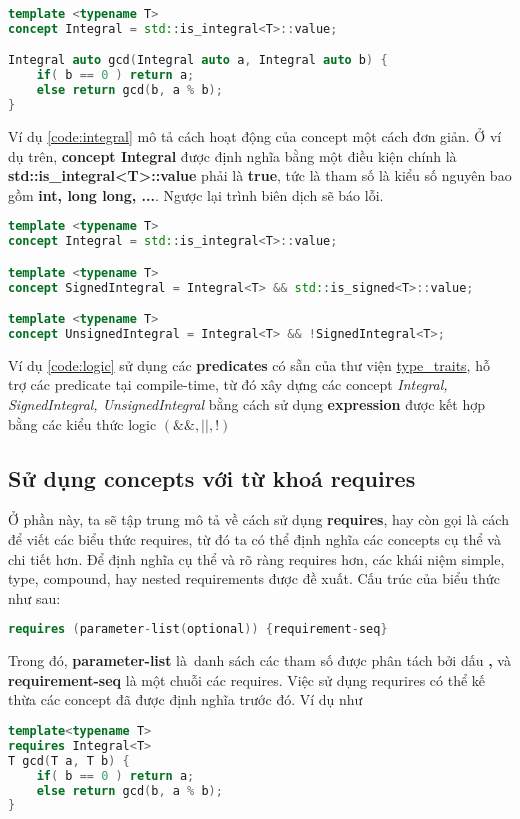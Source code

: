 \begin{lstlisting}[caption={Integral concept\cite{concept-def}},label={code:integral},language=C++]
template <typename T>
concept Integral = std::is_integral<T>::value;

Integral auto gcd(Integral auto a, Integral auto b) {
    if( b == 0 ) return a;
    else return gcd(b, a % b);
}    
\end{lstlisting}
Ví dụ \ref{code:integral} mô tả cách hoạt động của concept một cách đơn giản. Ở ví dụ trên, \textbf{concept Integral} được định nghĩa bằng một điều kiện chính là \textbf{std::is\_integral<T>::value} phải là \textbf{true}, tức là tham số là kiểu số nguyên bao gồm \textbf{int, long long, ...}. Ngược lại trình biên dịch sẽ báo lỗi.

\begin{lstlisting}[caption={Combine logic concept\cite{concept-def}},label={code:logic},language=C++]
template <typename T>         
concept Integral = std::is_integral<T>::value;

template <typename T>          
concept SignedIntegral = Integral<T> && std::is_signed<T>::value;

template <typename T>           
concept UnsignedIntegral = Integral<T> && !SignedIntegral<T>;
\end{lstlisting}
Ví dụ \ref{code:logic} sử dụng các \textbf{predicates} có sẵn của thư viện \href{https://en.cppreference.com/w/cpp/header/type_traits}{type\_traits}, hỗ trợ các predicate tại compile-time, từ đó xây dựng các concept \textit{Integral, SignedIntegral, UnsignedIntegral} bằng cách sử dụng \textbf{expression} được kết hợp bằng các kiểu thức logic $(\&\&,||,!)$

\subsection{Sử dụng concepts với từ khoá requires}
\label{sec:require_expr}
Ở phần này, ta sẽ tập trung mô tả về cách sử dụng \textbf{requires}, hay còn gọi là cách để viết các biểu thức requires, từ đó ta có thể định nghĩa các concepts cụ thể và chi tiết hơn. Để định nghĩa cụ thể và rõ ràng requires hơn, các khái niệm simple, type, compound, hay nested requirements được đề xuất. Cấu trúc của biểu thức như sau:
\begin{lstlisting}[caption={Cú pháp của requires\cite{concept-req}},label={code:require_syntx},language=C++]
requires (parameter-list(optional)) {requirement-seq}
\end{lstlisting}
Trong đó, \textbf{parameter-list} là danh sách các tham số được phân tách bởi dấu \textbf{,} và \textbf{requirement-seq} là một chuỗi các requires. Việc sử dụng requrires có thể kế thừa các concept đã được định nghĩa trước đó. Ví dụ như
\begin{lstlisting}[caption={Integral concept sử dụng requires\cite{concept-req}},label={code:integral2},language=C++]
template<typename T>                                  
requires Integral<T>
T gcd(T a, T b) {
    if( b == 0 ) return a;
    else return gcd(b, a % b);
}
 \end{lstlisting}


